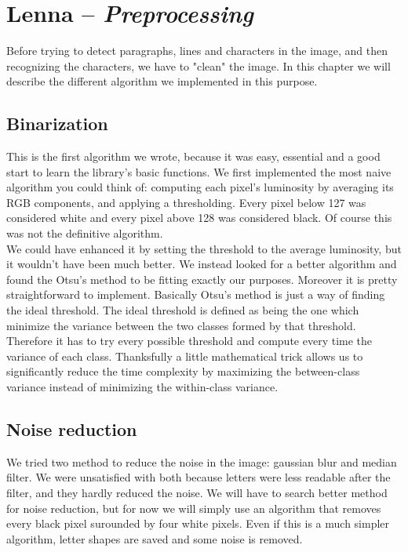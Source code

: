 \chapter{Lenna -- \emph{Preprocessing}}

Before trying to detect paragraphs, lines and characters in the image, and then recognizing the characters, we have to "clean" the image. In this chapter we will describe the different algorithm we implemented in this purpose.

\section{Binarization}
This is the first algorithm we wrote, because it was easy, essential and a good
start to learn the library's basic functions. We first implemented the most
naive algorithm you could think of: computing each pixel's luminosity by
averaging its RGB components, and applying a thresholding. Every pixel below 127
was considered white and every pixel above 128 was considered black.
Of course this was not the definitive algorithm.\\

We could have enhanced it by setting the threshold to the average luminosity,
but it wouldn't have been much better. We instead looked for a better algorithm
and found the Otsu's method to be fitting exactly our purposes. Moreover it is
pretty straightforward to implement. Basically Otsu's method is just a way of
finding the ideal threshold. The ideal threshold is defined as being the one
which minimize the variance between the two classes formed by that threshold.
Therefore it has to try every possible threshold and compute every time the
variance of each class. Thanksfully a little mathematical trick allows us to
significantly reduce the time complexity by maximizing the between-class
variance instead of minimizing the within-class variance.\\

\section{Noise reduction}

We tried two method to reduce the noise in the image: gaussian blur and median
filter. We were unsatisfied with both because letters were less readable after
the filter, and they hardly reduced the noise. We will have to search better
method for noise reduction, but for now we will simply use an algorithm that
removes every black pixel surounded by four white pixels. Even if this is a much
simpler algorithm, letter shapes are saved and some noise is removed.

